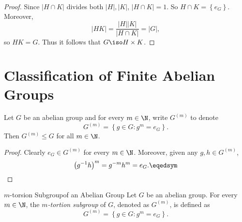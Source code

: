 \documentclass[pmath347]{subfiles}
\begin{document}
    \begin{proof}
        Since $\left| H\cap K \right|$ divides both $\left| H \right| , \left| K \right|$, $\left| H\cap K \right| = 1$. So $H\cap K = \left\lbrace e_G \right\rbrace$. Moreover,
        \begin{equation*}
            \left| HK \right| = \frac{\left| H \right| \left| K \right| }{\left| H\cap K \right| } = \left| G \right| ,
        \end{equation*}
        so $HK=G$. Thus it follows that $G\iso H\times K$.
    \end{proof}

    \section{Classification of Finite Abelian Groups}
    
    \begin{prop}{}
        Let $G$ be an abelian group and for every $m\in\N$, write $G^{\left( m \right) }$ to denote
        \begin{equation*}
            G^{\left( m \right)} = \left\lbrace g\in G:g^m=e_G \right\rbrace .
        \end{equation*}
        Then $G^{\left( m \right) }\leq G$ for all $m\in\N$.
    \end{prop}

    \begin{proof}
        Clearly $e_G\in G^{\left( m \right) }$ for every $m\in\N$. Moreover, given any $g,h\in G^{\left( m \right) }$,
        \begin{equation*}
            \left( g^{-1} h \right) ^m = g^{-m}h^m = e_G. \eqedsym
        \end{equation*}
    \end{proof}

    \begin{definition}{$m$-torsion Subgroup}{of an Abelian Group}
        Let $G$ be an abelian group. For every $m\in\N$, the \emph{$m$-tortion subgroup} of $G$, denoted as $G^{\left( m \right) }$, is defined as
        \begin{equation*}
            G^{\left( m \right) } = \left\lbrace g\in G: g^m=e_G \right\rbrace .
        \end{equation*}
    \end{definition}
\end{document}
